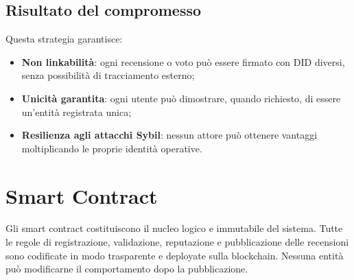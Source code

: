         \subsection{Risultato del compromesso}
            Questa strategia garantisce:
                \begin{itemize}
                    \item \textbf{Non linkabilità}: ogni recensione o voto può essere firmato con DID diversi, senza possibilità di tracciamento esterno;
                    
                    \item \textbf{Unicità garantita}: ogni utente può dimostrare, quando richiesto, di essere un'entità registrata unica;
                    
                    \item \textbf{Resilienza agli attacchi Sybil}: nessun attore può ottenere vantaggi moltiplicando le proprie identità operative.
                \end{itemize}
    
    \section{Smart Contract}
        Gli smart contract costituiscono il nucleo logico e immutabile del sistema. Tutte le regole di registrazione, validazione, reputazione e pubblicazione delle recensioni sono codificate in modo trasparente e deployate sulla blockchain. Nessuna entità può modificarne il comportamento dopo la pubblicazione.

